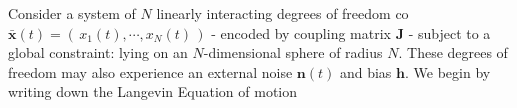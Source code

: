 Consider a system of $N$ linearly interacting degrees of freedom co $\mathbf{\bar x}(t) = \left(\,x_1(t),\cdots, x_N(t)\,\right)$ - encoded by coupling matrix $\mathbf{J}$ - subject to a global constraint: lying on an $N$-dimensional sphere of radius $N$. These degrees of freedom may also experience an external noise $\mathbf{n}(t)$ and bias $\mathbf{h}$. We begin by writing down the Langevin Equation of motion